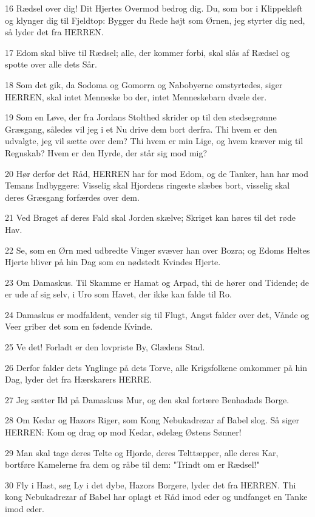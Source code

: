 \par 16 Rædsel over dig! Dit Hjertes Overmod bedrog dig. Du, som bor i Klippekløft og klynger dig til Fjeldtop: Bygger du Rede højt som Ørnen, jeg styrter dig ned, så lyder det fra HERREN.
\par 17 Edom skal blive til Rædsel; alle, der kommer forbi, skal slås af Rædsel og spotte over alle dets Sår.
\par 18 Som det gik, da Sodoma og Gomorra og Nabobyerne omstyrtedes, siger HERREN, skal intet Menneske bo der, intet Menneskebarn dvæle der.
\par 19 Som en Løve, der fra Jordans Stolthed skrider op til den stedsegrønne Græsgang, således vil jeg i et Nu drive dem bort derfra. Thi hvem er den udvalgte, jeg vil sætte over dem? Thi hvem er min Lige, og hvem kræver mig til Regnskab? Hvem er den Hyrde, der står sig mod mig?
\par 20 Hør derfor det Råd, HERREN har for mod Edom, og de Tanker, han har mod Temans Indbyggere: Visselig skal Hjordens ringeste slæbes bort, visselig skal deres Græsgang forfærdes over dem.
\par 21 Ved Braget af deres Fald skal Jorden skælve; Skriget kan høres til det røde Hav.
\par 22 Se, som en Ørn med udbredte Vinger svæver han over Bozra; og Edoms Heltes Hjerte bliver på hin Dag som en nødstedt Kvindes Hjerte.
\par 23 Om Damaskus. Til Skamme er Hamat og Arpad, thi de hører ond Tidende; de er ude af sig selv, i Uro som Havet, der ikke kan falde til Ro.
\par 24 Damaskus er modfaldent, vender sig til Flugt, Angst falder over det, Vånde og Veer griber det som en fødende Kvinde.
\par 25 Ve det! Forladt er den lovpriste By, Glædens Stad.
\par 26 Derfor falder dets Ynglinge på dets Torve, alle Krigsfolkene omkommer på hin Dag, lyder det fra Hærskarers HERRE.
\par 27 Jeg sætter Ild på Damaskuss Mur, og den skal fortære Benhadads Borge.
\par 28 Om Kedar og Hazors Riger, som Kong Nebukadrezar af Babel slog. Så siger HERREN: Kom og drag op mod Kedar, ødelæg Østens Sønner!
\par 29 Man skal tage deres Telte og Hjorde, deres Telttæpper, alle deres Kar, bortføre Kamelerne fra dem og råbe til dem: "Trindt om er Rædsel!"
\par 30 Fly i Hast, søg Ly i det dybe, Hazors Borgere, lyder det fra HERREN. Thi kong Nebukadrezar af Babel har oplagt et Råd imod eder og undfanget en Tanke imod eder.
